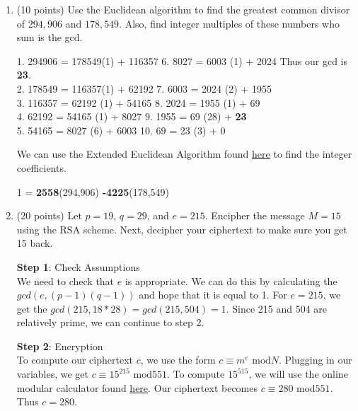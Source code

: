 \documentclass[12pt]{article}
\begin{document}
\begin{enumerate}

\item (10 points)
Use the Euclidean algorithm to find the greatest common divisor of $294,906$ and $178,549$.  Also, find integer multiples of these numbers who sum is the gcd.


1.  294906 = 178549(1)  + 116357 \hspace{10mm} 6.  8027   = 6003  (1)  + 2024 \qquad Thus our gcd is \textbf{23}.\\ 
2.  178549 = 116357(1)  + 62192  \hspace{12mm} 7.  6003   = 2024  (2)  + 1955 \qquad \\
3.  116357 = 62192 (1)  + 54165  \hspace{13mm} 8.  2024   = 1955  (1)  + 69 \\
4.  62192  = 54165 (1)  + 8027   \hspace{17mm} 9.  1955   = 69    (28) + \textbf{23} \\
5.  54165  = 8027  (6)  + 6003    \hspace{18mm} 10. 69     = 23    (3)  + 0 

We can use the Extended Euclidean Algorithm found \href{https://planetcalc.com/3298/}{here} to find the integer coefficients.

1 = \textbf{2558}(294,906) \textbf{-4225}(178,549)\\



\item (20 points)
Let $p=19$, $q=29$, and $e=215$.  Encipher the message $M=15$ using the RSA scheme.  Next, decipher your ciphertext to make sure you get 15 back.

\textbf{Step 1}: Check Assumptions\\
We need to check that $e$ is appropriate. We can  do this by calculating the $gcd(e, (p-1)(q-1))$ and hope that it is equal to 1. For $e=215$, we get the $gcd(215,18*28)=gcd(215,504)=1$. Since 215 and 504 are relatively prime, we can continue to step 2.

\textbf{Step 2}: Encryption\\
To compute our ciphertext $c$, we use the form $c\equiv m^e \text{ mod}N$. Plugging in our variables, we get $c\equiv 15^{215} \text{ mod}551$. To compute $15^{515}$, we will use the online modular calculator found \href{https://www.dcode.fr/modular-exponentiation}{here}. Our ciphertext becomes $c\equiv 280 \text{ mod}551$. Thus $c=280$.


\end{enumerate}
\end{document}
